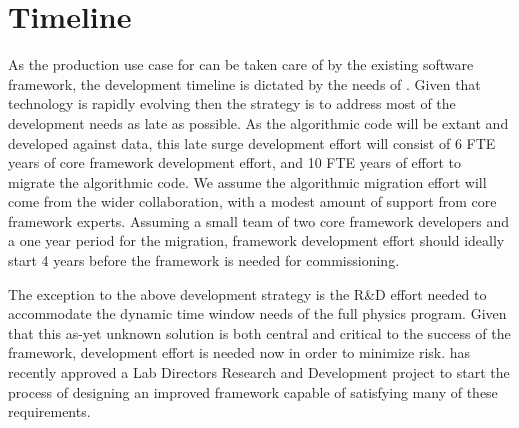 \documentclass[../main-v1.tex]{subfiles}
\begin{document}
\section{Timeline}

As the production use case for  can be taken care of by the existing software framework, the development timeline is dictated by the needs of .  Given that technology is rapidly evolving then the strategy is to address most of the development needs as late as possible. As the algorithmic code will be extant and developed against  data, this late surge development effort will consist of 6 FTE years of core framework development effort, and 10 FTE years of effort to migrate the algorithmic code.  We assume the algorithmic migration effort will come from the wider collaboration, with a modest amount of support from core framework experts.
Assuming a small team of two core framework developers
and a one year period for the migration, framework development effort should ideally start 4 years before the framework is needed for commissioning.

The exception to the above development strategy is the R\&D effort needed to accommodate the dynamic time window needs of the full  physics program.  Given that this as-yet unknown solution is both central and critical to the success of the framework, development effort is needed now in order to minimize risk.
 has recently approved a Lab Directors Research and Development project to start the process of designing an improved framework capable of satisfying many of these requirements. 




\end{document}
